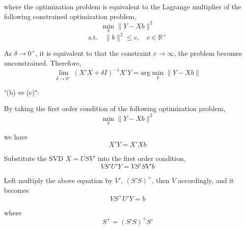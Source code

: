 \documentclass[a4paper]{article}
\begin{document}
where the optimization problem is equivalent to the Lagrange multiplier of the following constrained optimization problem,
\[\min_b \lVert Y-Xb \rVert^2\]
\[\text{s.t.}\quad \lVert b \rVert^2 \leq c,\quad c\in\mathbb{R}^{+}\]

As $\delta\to 0^{+}$, it is equivalent to that the constraint $c\to\infty$, the problem becomes unconstrained. Therefore, 
\[\lim_{\delta\to 0^{+}}(X'X+\delta I)^{-1} X'Y =\text{arg}\min_b \lVert Y-Xb \rVert\]

"(b)$\Leftrightarrow$(c)":\newline

By taking the first order condition of the following optimization problem,
\[\min_b \lVert Y-Xb \rVert^2\]

we have
\[X'Y=X'Xb\]

Substitute the SVD $X=USV'$ into the first order condition,
\[VS'U'Y=VS'SV'b\]

Left multiply the above equation by $V'$, ${(S'S)}^{+}$, then $V$ accordingly, and it becomes
\[VS^{+}U'Y=b\]

where
\[S^{+}={(S'S)}^{+} S'\]
\end{document}
